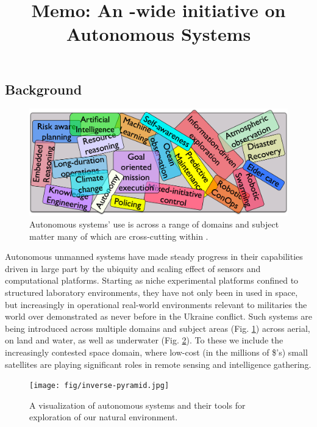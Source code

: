 \documentclass[11pt,letterpaper]{article}
\title{Memo: An \auke-wide initiative on Autonomous Systems}
\author{%
  }
\begin{document}
\maketitle{}

\subsection{Background}

\begin{figure}
  \vspace{-0.5cm}
  \centering
  \includegraphics[scale=0.06]{fig/word-bag.jpg}
  \caption{Autonomous systems' use is across a range of domains and
    subject matter many of which are cross-cutting within \orge.}
 \label{fig:topics}
\end{figure}

Autonomous unmanned systems have made steady progress in their
capabilities driven in large part by the ubiquity and scaling effect
of sensors and computational platforms. Starting as niche experimental
platforms confined to structured laboratory environments, they have
not only been in used in space, but increasingly in operational
real-world environments relevant to militaries the world over
demonstrated as never before in the Ukraine conflict. Such systems are
being introduced across multiple domains and subject areas
(Fig. \ref{fig:topics}) across aerial, on land and water, as well as
underwater (Fig. \ref{fig:inverse}). To these we include the
increasingly contested space domain, where low-cost (in the millions
of \$'s) small satellites are playing significant roles in remote
sensing and intelligence gathering.

\begin{figure}  
  \centering 
  \texttt{[image: fig/inverse-pyramid.jpg]} 
  \caption{A visualization of autonomous systems and their tools for
    exploration of our natural environment.}
  \label{fig:inverse}
\end{figure}
\end{document}
